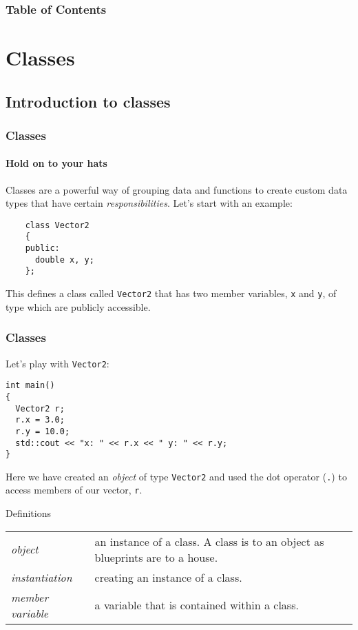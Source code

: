\documentclass{beamer}
\subtitle{Session 3: Object oriented programming}
\begin{document}
\frame{\titlepage}

\begin{frame}
\frametitle{Table of Contents}
\tableofcontents
\end{frame}


\section{Classes}

\subsection{Introduction to classes}

\begin{frame}[fragile]
	\frametitle{Classes}
	\framesubtitle{Hold on to your hats}
	
	Classes are a powerful way of grouping data and functions to create custom data types that have certain \textit{responsibilities}.\newline
	\pause
	Let's start with an example:
	\begin{lstlisting}
	class Vector2
	{
	public:
	  double x, y;
	};
	\end{lstlisting}
	This defines a class called \texttt{Vector2} that has two member variables, \texttt{x} and \texttt{y}, of type  which are publicly accessible.
	
\end{frame}

\begin{frame}[fragile]
  \frametitle{Classes}
  
  Let's play with \texttt{Vector2}:
  \begin{lstlisting}
int main()
{
  Vector2 r;
  r.x = 3.0;
  r.y = 10.0;
  std::cout << "x: " << r.x << " y: " << r.y;
}
  \end{lstlisting}
  Here we have created an \textit{object} of type \texttt{Vector2} and used the dot operator (\texttt{.}) to access members of our vector, \texttt{r}.
  \pause
  \begin{defiblockbaree}{Definitions}
    \begin{tabularx}{\linewidth}{lX}
	    \textit{object} & an instance of a class. A class is to an object as blueprints are to a house. \\
	    \textit{instantiation} & creating an instance of a class. \\
	    \textit{member variable} & a variable that is contained within a class.
    \end{tabularx}
  \end{defiblockbaree}

\end{frame}
\end{document}
